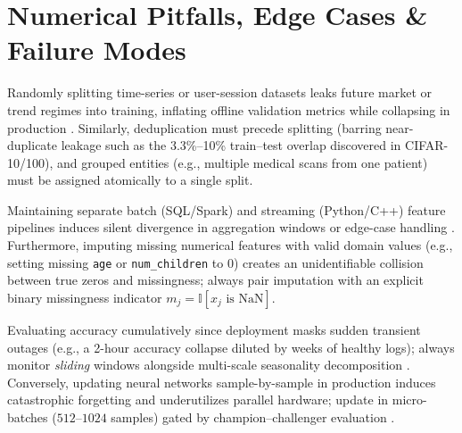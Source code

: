 \documentclass[../../../../master.tex]{subfiles}
\begin{document}
\section{Numerical Pitfalls, Edge Cases \& Failure Modes}\label{sec:mlsys:pitfalls}

\begin{pitfall}
Randomly splitting time-series or user-session datasets leaks future market or trend regimes into training, inflating offline validation metrics while collapsing in production . Similarly, deduplication must precede splitting (barring near-duplicate leakage such as the 3.3\%--10\% train--test overlap discovered in CIFAR-10/100), and grouped entities (e.g., multiple medical scans from one patient) must be assigned atomically to a single split.
\end{pitfall}

\begin{pitfall}
Maintaining separate batch (SQL/Spark) and streaming (Python/C++) feature pipelines induces silent divergence in aggregation windows or edge-case handling . Furthermore, imputing missing numerical features with valid domain values (e.g., setting missing \texttt{age} or \texttt{num\_children} to $0$) creates an unidentifiable collision between true zeros and missingness; always pair imputation with an explicit binary missingness indicator $m_j = \mathbb{I}[x_j\text{ is NaN}]$.
\end{pitfall}

\begin{pitfall}
Evaluating accuracy cumulatively since deployment masks sudden transient outages (e.g., a 2-hour accuracy collapse diluted by weeks of healthy logs); always monitor \emph{sliding} windows alongside multi-scale seasonality decomposition . Conversely, updating neural networks sample-by-sample in production induces catastrophic forgetting and underutilizes parallel hardware; update in micro-batches ($512$--$1024$ samples) gated by champion--challenger evaluation .
\end{pitfall}
\end{document}
